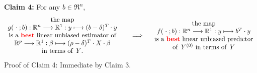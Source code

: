 \begin{enumerate}
	\vskip 0.5cm
	\noindent
	\textbf{Claim 4:}\quad
	For any $b \in \Re^{n}$,
	\begin{equation*}
		\begin{array}{c}
		\textnormal{the map}
		\\
		g(\;\cdot\;;b) : \Re^{n} \longrightarrow \Re^{1} : y \longmapsto (b - \delta)^{T}\cdot y
		\\
		\textnormal{is a \textbf{\color{red}best} linear unbiased estimator of}
		\\
		\Re^{p} \longrightarrow \Re^{1} : \beta \longmapsto (\rho - \delta)^{T} \cdot X \cdot \beta
		\\
		\textnormal{in terms of \,$Y$.}
		\end{array}
	\;\;\quad\Longrightarrow\quad
		\begin{array}{c}
		\textnormal{the map}
		\\
		f(\;\cdot\;;b) : \Re^{n} \longrightarrow \Re^{1} : y \longmapsto b^{T}\cdot y
		\\
		\textnormal{is a \textbf{\color{red}best} linear unbiased predictor}
		\\
		\textnormal{of \,$Y^{(0)}$ in terms of \,$Y$}
		\end{array}
	\end{equation*}
	\noindent
	Proof of Claim 4: \quad Immediate by Claim 3.
	
\end{enumerate}




